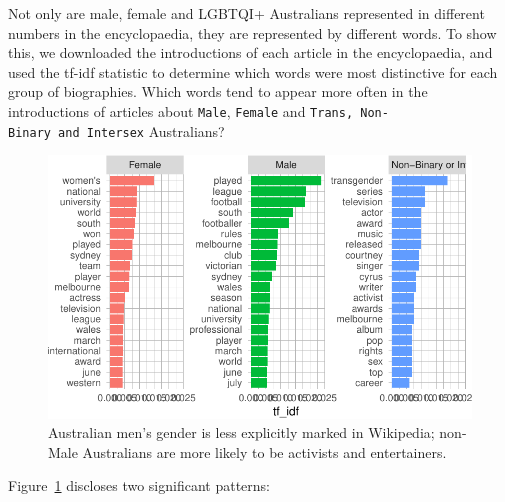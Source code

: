 \documentclass[
  a4paper,
  DIV=11,
  numbers=noendperiod]{scrreprt}
\begin{document}
Not only are male, female and LGBTQI+ Australians represented in
different numbers in the encyclopaedia, they are represented by
different words. To show this, we downloaded the introductions of each
article in the encyclopaedia, and used the tf-idf statistic to determine
which words were most distinctive for each group of biographies. Which
words tend to appear more often in the introductions of articles about
\texttt{Male}, \texttt{Female} and
\texttt{Trans,\ Non-Binary\ and\ Intersex} Australians?

\begin{figure}

{\centering \includegraphics{who-counts_files/figure-pdf/fig-intro-words-by-gender-1.pdf}

}

\caption{\label{fig-intro-words-by-gender}Australian men's gender is
less explicitly marked in Wikipedia; non-Male Australians are more
likely to be activists and entertainers.}

\end{figure}

Figure~\ref{fig-intro-words-by-gender} discloses two significant
patterns:
\end{document}
